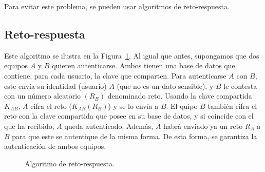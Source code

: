 Para evitar este problema, se pueden usar algoritmos de reto-respuesta.
\subsection{Reto-respuesta}
Este algoritmo se ilustra en la Figura~\ref{fig:reto-respuesta}.
Al igual que antes, supongamos que dos equipos $A$ y $B$ quieren autenticarse. Ambos tienen una base de datos que contiene, para cada usuario, la clave que comparten. Para autenticarse $A$ con $B$, este envía su identidad (usuario) $A$ (que no es un dato sensible), y $B$ le contesta con un número aleatorio $(R_B)$ denominado reto. Usando la clave compartida $K_{AB}$, $A$ cifra el reto ($K_{AB}(R_B)$) y se lo envía a $B$. El quipo $B$ también cifra el reto con la clave compartida que posee en su base de datos, y si coincide con el que ha recibido, $A$ queda autenticado. Además, $A$ habrá enviado ya un reto $R_A$ a $B$ para que este se autentique de la misma forma. De esta forma, se garantiza la autenticación de ambos equipos.\\
\begin{figure}
    \centering
    \caption{Algoritmo de reto-respuesta.}
    \label{fig:reto-respuesta}
\end{figure}

